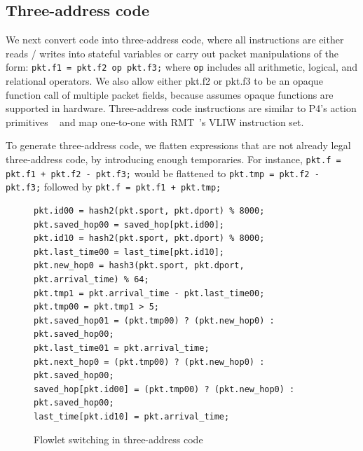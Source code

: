 \subsection{Three-address code}
We next convert code into three-address code, where all
instructions are either reads / writes into stateful variables or carry out
packet manipulations of the form: \texttt{pkt.f1 = pkt.f2 op pkt.f3;} where
\texttt{op} includes all arithmetic, logical, and relational operators. We also
allow either pkt.f2 or pkt.f3 to be an opaque function call of multiple packet
fields, because \pktlanguage assumes opaque functions are supported in
hardware. Three-address code instructions are similar to P4's action primitives
~\cite{p4spec} and map one-to-one with RMT~\cite{rmt}'s VLIW instruction set.

To generate three-address code, we flatten expressions that are not
already legal three-address code, by introducing enough temporaries. For
instance, \texttt{pkt.f = pkt.f1 + pkt.f2 - pkt.f3;} would be flattened to
\texttt{pkt.tmp = pkt.f2 - pkt.f3;} followed by \texttt{pkt.f = pkt.f1 +
pkt.tmp;}

\begin{figure}[!h]
\begin{tiny}
\begin{lstlisting}
pkt.id00 = hash2(pkt.sport, pkt.dport) % 8000;
pkt.saved_hop00 = saved_hop[pkt.id00];
pkt.id10 = hash2(pkt.sport, pkt.dport) % 8000;
pkt.last_time00 = last_time[pkt.id10];
pkt.new_hop0 = hash3(pkt.sport, pkt.dport, pkt.arrival_time) % 64;
pkt.tmp1 = pkt.arrival_time - pkt.last_time00;
pkt.tmp00 = pkt.tmp1 > 5;
pkt.saved_hop01 = (pkt.tmp00) ? (pkt.new_hop0) : pkt.saved_hop00;
pkt.last_time01 = pkt.arrival_time;
pkt.next_hop0 = (pkt.tmp00) ? (pkt.new_hop0) : pkt.saved_hop00;
saved_hop[pkt.id00] = (pkt.tmp00) ? (pkt.new_hop0) : pkt.saved_hop00;
last_time[pkt.id10] = pkt.arrival_time;
\end{lstlisting}
\end{tiny}
\caption{Flowlet switching in three-address code}
\label{fig:three_address}
\end{figure}

